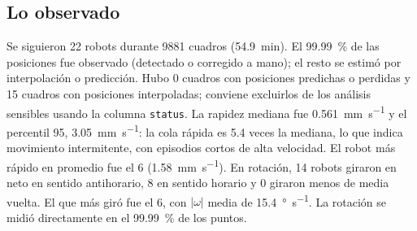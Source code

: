 \subsection{Lo observado}
Se siguieron \num{22} robots durante \num{9881} cuadros (\SI{54.9}{\minute}). El \SI{99.99}{\percent} de las posiciones fue observado (detectado o corregido a mano); el resto se estimó por interpolación o predicción.
Hubo \num{0} cuadros con posiciones predichas o perdidas y \num{15} cuadros con posiciones interpoladas; conviene excluirlos de los análisis sensibles usando la columna \texttt{status}.
La rapidez mediana fue \SI{0.561}{\milli\metre\per\second} y el percentil 95, \SI{3.05}{\milli\metre\per\second}: la cola rápida es \num{5.4} veces la mediana, lo que indica movimiento intermitente, con episodios cortos de alta velocidad.
El robot más rápido en promedio fue el \num{6} (\SI{1.58}{\milli\metre\per\second}).
En rotación, \num{14} robots giraron en neto en sentido antihorario, \num{8} en sentido horario y \num{0} giraron menos de media vuelta. El que más giró fue el \num{6}, con $|\omega|$ media de \SI{15.4}{\degree\per\second}. La rotación se midió directamente en el \SI{99.99}{\percent} de los puntos.

\endgroup
